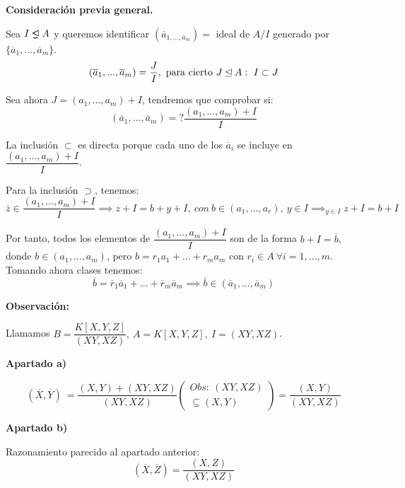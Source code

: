 \documentclass[openany]{book}
\begin{document}
\begin{exercise}
    \textbf{Consideración previa general.}

    Sea $ I \properideal A $ y queremos identificar $ (\overline{a}_{1,...,\overline{a}_{m}}) = $ ideal de $ A/I $ generado por $ \{\overline{a}_{1},...,\overline{a}_{m}\} $.
    $$ (\overline{a}_{1},...,\overline{a}_{m}) = \dfrac{J}{I},\ \text{para cierto }J \unlhd A:\ I \subset J $$

    Sea ahora $ J = (a_1,...,a_m) +I $, tendremos que comprobar si:
    $$ (\overline{a}_{1},...,\overline{a}_{m}) =? \dfrac{(a_1,...,a_m)+I}{I} $$

    La inclusión $ \subset  $ es directa porque cada uno de los $ \overline{a}_{i} $ se incluye en $\dfrac{(a_1,...,a_m)+I}{I}$.

    Para la inclusión $ \supset $, tenemos:
    $$ \overline{z} \in \dfrac{(a_1,...,a_m)+I}{I} \implies z +I = b+y+I,\ con\ b \in (a_1,...,a_{r}),\ y \in I \implies_{y \in I} z+I = b+I$$

    Por tanto, todos los elementos de $ \dfrac{(a_1,...,a_m)+I}{I} $ son de la forma $ b+I =\overline{b}$, donde $ b \in (a_1,...,a_m) $, pero $ b = r_1a_1+...+r_ma_m $ con $ r_i \in A\ \forall i =1,...,m $. Tomando ahora clases tenemos:
    $$ \overline{b} = \overline{r}_1\overline{a}_1+...+\overline{r}_m\overline{a}_m \implies \overline{b} \in (\overline{a}_{1},...,\overline{a}_{m}) $$

\hrulefill

    \begin{flushright}
        \textbf{Observación:}
    \end{flushright}

    Llamamos $ B = \dfrac{K[X,Y,Z]}{(XY,XZ)},\ A = K[X,Y,Z],\ I = (XY,XZ) $.

    \begin{flushright}
        \textbf{Apartado a)}
    \end{flushright}
    
    $$ (\overline{X},\overline{Y})\ = \dfrac{(X,Y)+(XY,XZ)}{(XY,XZ)} \left( \substack{Obs:\ (XY,XZ)\\ \subseteq (X,Y)} \right) = \dfrac{(X,Y)}{(XY,XZ)}$$

    \begin{flushright}
        \textbf{Apartado b)}
    \end{flushright}
    
    Razonamiento parecido al apartado anterior:
    $$ (\overline{X},\overline{Z}) = \dfrac{(X,Z)}{(XY,XZ)} $$


\end{exercise}
\end{document}
